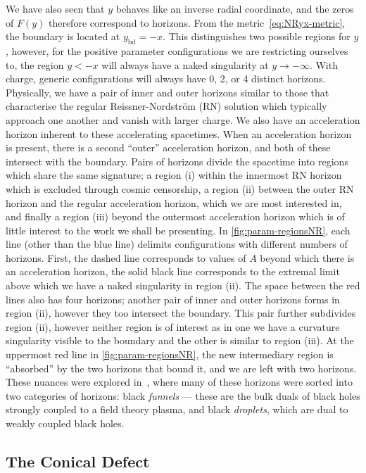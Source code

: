 \documentclass[
twoside,
openright,
frontopenright
]{dmathesis}
\begin{document}
We have also seen that $y$ behaves like an inverse radial coordinate, and the
zeros of $F(y)$ therefore correspond to horizons. From the
metric~\eqref{eq:NRyx-metric}, the boundary is located at $y_\mathrm{bd} =
-x$. This distinguishes two possible regions for $y$, however, for the positive
parameter configurations we are restricting ourselves to, the region $y<-x$ will
always have a naked singularity at $y \to -\infty$. With charge, generic
configurations will always have 0, 2, or 4 distinct horizons. Physically, we
have a pair of inner and outer horizons similar to those that characterise the
regular Reissner-Nordstr\"om (RN) solution which typically approach one another
and vanish with larger charge. We also have an acceleration horizon inherent to
these accelerating spacetimes. When an acceleration horizon is present, there is
a second ``outer'' acceleration horizon, and both of these intersect with the
boundary. Pairs of horizons divide the spacetime into regions which share the
same signature; a region (i) within the innermost RN horizon which is excluded
through cosmic censorship, a region (ii) between the outer RN horizon and the
regular acceleration horizon, which we are most interested in, and finally a
region (iii) beyond the outermost acceleration horizon which is of little
interest to the work we shall be presenting. In \cref{fig:param-regionsNR}, each
line (other than the blue line) delimits configurations with different numbers
of horizons. First, the dashed line corresponds to values of $A$ beyond which
there is an acceleration horizon, the solid black line corresponds to the
extremal limit above which we have a naked singularity in region (ii). The space
between the red lines also has four horizons; another pair of inner and outer
horizons forms in region (ii), however they too intersect the boundary. This
pair further subdivides region (ii), however neither region is of interest as in
one we have a curvature singularity visible to the boundary and the other is
similar to region (iii). At the uppermost red line in
\cref{fig:param-regionsNR}, the new intermediary region is ``absorbed'' by the
two horizons that bound it, and we are left with two horizons. These nuances
were explored in~\cite{Hubeny:2009kz}, where many of these horizons were sorted
into two categories of horizons: black \emph{funnels} --- these are the bulk
duals of black holes strongly coupled to a field theory plasma, and black
\emph{droplets}, which are dual to weakly coupled black holes.

\subsection{The Conical Defect}
\label{sec:conical}
\end{document}
